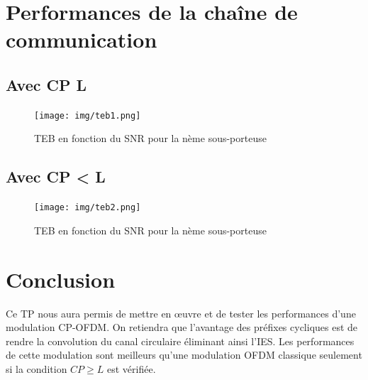 \documentclass[11pt]{article}
\begin{document}
	\section{Performances de la chaîne de communication}
	
		\subsection{Avec CP \geq L}
		
		\begin{figure}[h]
			\centering
			\texttt{[image: img/teb1.png]}
			\caption{TEB en fonction du SNR pour la nème sous-porteuse}
			\label{teb1}
		\end{figure}
		
		\subsection{Avec CP < L}

		\begin{figure}[h]
			\centering
			\texttt{[image: img/teb2.png]}
			\caption{TEB en fonction du SNR pour la nème sous-porteuse}
			\label{teb2}
		\end{figure}
		
		\section{Conclusion}
		Ce TP nous aura permis de mettre en œuvre et de tester les performances d'une modulation CP-OFDM. On retiendra que l'avantage des préfixes cycliques est de rendre la convolution du canal circulaire éliminant ainsi l'IES. Les performances de cette modulation sont meilleurs qu'une modulation OFDM classique seulement si la condition $CP \geq L$ est vérifiée.
\end{document}
